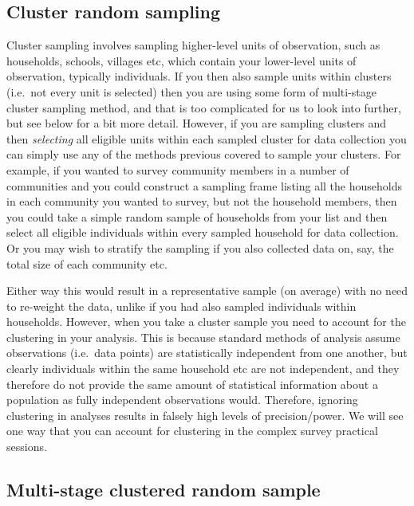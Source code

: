 \documentclass[
]{book}
\begin{document}
\hypertarget{cluster-random-sampling}{%
\subsection{Cluster random sampling}\label{cluster-random-sampling}}

Cluster sampling involves sampling higher-level units of observation, such as households, schools, villages etc, which contain your lower-level units of observation, typically individuals. If you then also sample units within clusters (i.e.~not every unit is selected) then you are using some form of multi-stage cluster sampling method, and that is too complicated for us to look into further, but see below for a bit more detail. However, if you are sampling clusters and then \emph{selecting} all eligible units within each sampled cluster for data collection you can simply use any of the methods previous covered to sample your clusters. For example, if you wanted to survey community members in a number of communities and you could construct a sampling frame listing all the households in each community you wanted to survey, but not the household members, then you could take a simple random sample of households from your list and then select all eligible individuals within every sampled household for data collection. Or you may wish to stratify the sampling if you also collected data on, say, the total size of each community etc.

Either way this would result in a representative sample (on average) with no need to re-weight the data, unlike if you had also sampled individuals within households. However, when you take a cluster sample you need to account for the clustering in your analysis. This is because standard methods of analysis assume observations (i.e.~data points) are statistically independent from one another, but clearly individuals within the same household etc are not independent, and they therefore do not provide the same amount of statistical information about a population as fully independent observations would. Therefore, ignoring clustering in analyses results in falsely high levels of precision/power. We will see one way that you can account for clustering in the complex survey practical sessions.

\hypertarget{multi-stage-clustered-random-sample}{%
\subsection{Multi-stage clustered random sample}\label{multi-stage-clustered-random-sample}}
\end{document}
